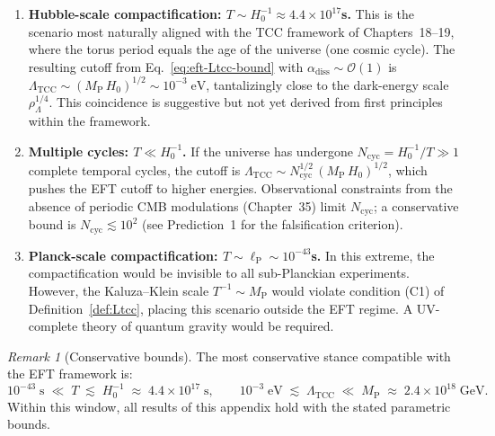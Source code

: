 \documentclass[12pt,openany]{book}
\theoremstyle{plain}
\theoremstyle{definition}
\theoremstyle{remark}
\newtheorem{eftremark}[efttheorem]{Remark}
\providecommand{\Ltcc}{\Lambda_{\mathrm{TCC}}}
\providecommand{\Mpl}{M_{\mathrm{P}}}
\providecommand{\lpl}{\ell_{\mathrm{P}}}
\providecommand{\order}[1]{\mathcal{O}\!\left(#1\right)}
\providecommand{\diss}{\mathrm{diss}}
\begin{document}
\begin{enumerate}
  \item \textbf{Hubble-scale compactification: $T \sim H_{0}^{-1}
    \approx 4.4 \times 10^{17}$\;s.}
    This is the scenario most naturally aligned with the TCC framework
    of Chapters~18--19, where the torus period equals the age of the
    universe (one cosmic cycle).  The resulting cutoff from
    Eq.~\eqref{eq:eft-Ltcc-bound} with $\alpha_{\diss} \sim \order{1}$
    is
    $\Ltcc \sim (\Mpl\,H_{0})^{1/2} \sim 10^{-3}\;\mathrm{eV}$,
    tantalizingly close to the dark-energy scale
    $\rho_{\Lambda}^{1/4}$.  This coincidence is suggestive but not
    yet derived from first principles within the framework.

  \item \textbf{Multiple cycles: $T \ll H_{0}^{-1}$.}
    If the universe has undergone $N_{\mathrm{cyc}} = H_0^{-1}/T \gg 1$
    complete temporal cycles, the cutoff is
    $\Ltcc \sim N_{\mathrm{cyc}}^{1/2}\,(\Mpl\,H_{0})^{1/2}$,
    which pushes the EFT cutoff to higher energies.  Observational
    constraints from the absence of periodic CMB modulations
    (Chapter~35) limit $N_{\mathrm{cyc}}$; a conservative bound is
    $N_{\mathrm{cyc}} \lesssim 10^{2}$
    (see Prediction~1 for the falsification criterion).

  \item \textbf{Planck-scale compactification: $T \sim \lpl
    \sim 10^{-43}$\;s.}
    In this extreme, the compactification would be invisible to all
    sub-Planckian experiments.  However, the Kaluza--Klein scale
    $T^{-1} \sim \Mpl$ would violate condition (C1) of
    Definition~\ref{def:Ltcc}, placing this scenario outside the EFT
    regime.  A UV-complete theory of quantum gravity would be
    required.
\end{enumerate}

\begin{eftremark}[Conservative bounds]
\label{rem:conservative}
The most conservative stance compatible with the EFT framework is:
\begin{equation}\label{eq:eft-conservative}
  10^{-43}\;\mathrm{s}
  \;\ll\; T \;\lesssim\; H_{0}^{-1}
  \;\approx\; 4.4\times 10^{17}\;\mathrm{s},
  \qquad
  10^{-3}\;\mathrm{eV}
  \;\lesssim\; \Ltcc \;\ll\; \Mpl
  \;\approx\; 2.4\times 10^{18}\;\mathrm{GeV}.
\end{equation}
Within this window, all results of this appendix hold with the
stated parametric bounds.
\end{eftremark}
\end{document}
